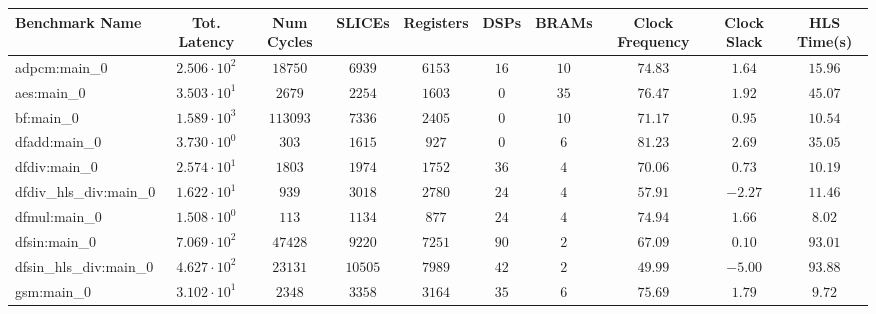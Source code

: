 \begin{tabular}{|l|c|c|c|c|c|c|c|c|c|}
\hline
Benchmark Name          & Tot. Latency           & Num Cycles & SLICEs    & Registers & DSPs    & BRAMs   & Clock Frequency & Clock Slack & HLS Time(s) \\
\hline
adpcm:main\_0           & $ 2.506 \cdot 10^{2} $ & $ 18750  $ & $ 6939  $ & $ 6153  $ & $ 16  $ & $ 10  $ & $ 74.83       $ & $ 1.64    $ & $ 15.96   $ \\
aes:main\_0             & $ 3.503 \cdot 10^{1} $ & $ 2679   $ & $ 2254  $ & $ 1603  $ & $ 0   $ & $ 35  $ & $ 76.47       $ & $ 1.92    $ & $ 45.07   $ \\
bf:main\_0              & $ 1.589 \cdot 10^{3} $ & $ 113093 $ & $ 7336  $ & $ 2405  $ & $ 0   $ & $ 10  $ & $ 71.17       $ & $ 0.95    $ & $ 10.54   $ \\
dfadd:main\_0           & $ 3.730 \cdot 10^{0} $ & $ 303    $ & $ 1615  $ & $ 927   $ & $ 0   $ & $ 6   $ & $ 81.23       $ & $ 2.69    $ & $ 35.05   $ \\
dfdiv:main\_0           & $ 2.574 \cdot 10^{1} $ & $ 1803   $ & $ 1974  $ & $ 1752  $ & $ 36  $ & $ 4   $ & $ 70.06       $ & $ 0.73    $ & $ 10.19   $ \\
dfdiv\_hls\_div:main\_0 & $ 1.622 \cdot 10^{1} $ & $ 939    $ & $ 3018  $ & $ 2780  $ & $ 24  $ & $ 4   $ & $ 57.91       $ & $ -2.27   $ & $ 11.46   $ \\
dfmul:main\_0           & $ 1.508 \cdot 10^{0} $ & $ 113    $ & $ 1134  $ & $ 877   $ & $ 24  $ & $ 4   $ & $ 74.94       $ & $ 1.66    $ & $ 8.02    $ \\
dfsin:main\_0           & $ 7.069 \cdot 10^{2} $ & $ 47428  $ & $ 9220  $ & $ 7251  $ & $ 90  $ & $ 2   $ & $ 67.09       $ & $ 0.10    $ & $ 93.01   $ \\
dfsin\_hls\_div:main\_0 & $ 4.627 \cdot 10^{2} $ & $ 23131  $ & $ 10505 $ & $ 7989  $ & $ 42  $ & $ 2   $ & $ 49.99       $ & $ -5.00   $ & $ 93.88   $ \\
gsm:main\_0             & $ 3.102 \cdot 10^{1} $ & $ 2348   $ & $ 3358  $ & $ 3164  $ & $ 35  $ & $ 6   $ & $ 75.69       $ & $ 1.79    $ & $ 9.72    $ \\

\end{tabular}
